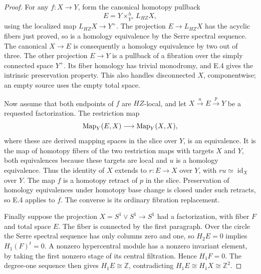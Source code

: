 \begin{proof}
For any $f:X\to Y$, form the canonical homotopy pullback
\[
                  E=Y\times^h_{Y^+}L_{HZ}X,
                                                               \tag{E.8.8}
\]
using the localized map $L_{HZ}X\to Y^+$. The projection
$E\to L_{HZ}X$ has the acyclic fibers just proved, so is a
homology equivalence by the Serre spectral sequence. The
canonical $X\to E$ is consequently a homology equivalence
by two out of three. The other projection $E\to Y$ is a
pullback of a fibration over the simply connected space $Y^+$.
Its fiber homology has trivial monodromy, and E.4 gives the
intrinsic preservation property. This also handles disconnected
$X$, componentwise; an empty source uses the empty total space.

Now assume that both endpoints of $f$ are $HZ$-local, and let
$X\xrightarrow{u}E\xrightarrow{p}Y$ be a requested factorization.
The restriction map
\[
              \operatorname{Map}_Y(E,X)\longrightarrow\operatorname{Map}_Y(X,X),
\]
where these are derived mapping spaces in the slice over $Y$,
is an equivalence. It is the map of homotopy fibers of the two
restriction maps with targets $X$ and $Y$, both equivalences
because these targets are local and $u$ is a homology equivalence.
Thus the identity of $X$ extends to $r:E\to X$ over $Y$, with
$ru\simeq\operatorname{id}_X$ over $Y$. The map $f$ is a
homotopy retract of $p$ in the slice. Preservation of homology
equivalences under homotopy base change is closed under such
retracts, so E.4 applies to $f$. The converse is its ordinary
fibration replacement.

Finally suppose the projection $X=S^1\vee S^1\to S^1$ had a
factorization, with fiber $F$ and total space $E$. The fiber is
connected by the first paragraph. Over the circle the Serre
spectral sequence has only columns zero and one, so
$H_2E=0$ implies $H_1(F)^{t}=0$. A nonzero hypercentral module
has a nonzero invariant element, by taking the first nonzero
stage of its central filtration. Hence $H_1F=0$. The degree-one
sequence then gives $H_1E\cong\mathbb Z$, contradicting
$H_1E\cong H_1X\cong\mathbb Z^2$.
\end{proof}

